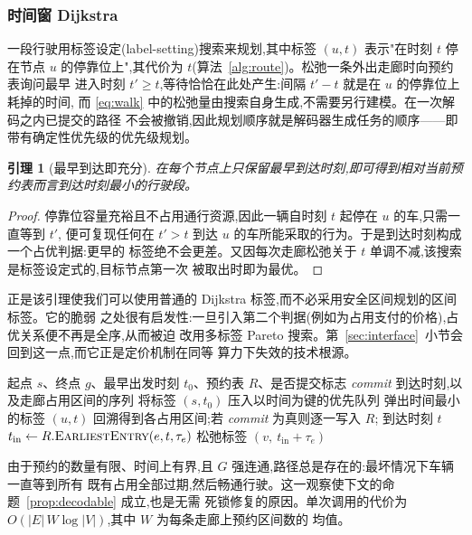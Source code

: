 \documentclass[manuscript,screen,review]{acmart}
\newtheorem{lem}{引理}
\begin{document}
\subsubsection{时间窗 Dijkstra}
一段行驶用标签设定(label-setting)搜索来规划,其中标签 $(u,t)$ 表示"在时刻 $t$ 停在节点
$u$ 的停靠位上",其代价为 $t$(算法~\ref{alg:route})。松弛一条外出走廊时向预约表询问最早
进入时刻 $t'\ge t$,等待恰恰在此处产生:间隔 $t'-t$ 就是在 $u$ 的停靠位上耗掉的时间,
而 \eqref{eq:walk} 中的松弛量由搜索自身生成,不需要另行建模。在一次解码之内已提交的路径
不会被撤销,因此规划顺序就是解码器生成任务的顺序——即带有确定性优先级的优先级规划。

\begin{lem}[最早到达即充分]
\label{lem:label}
在每个节点上只保留最早到达时刻,即可得到相对当前预约表而言到达时刻最小的行驶段。
\end{lem}

\begin{proof}
停靠位容量充裕且不占用通行资源,因此一辆自时刻 $t$ 起停在 $u$ 的车,只需一直等到 $t'$,
便可复现任何在 $t'>t$ 到达 $u$ 的车所能采取的行为。于是到达时刻构成一个占优判据:更早的
标签绝不会更差。又因每次走廊松弛关于 $t$ 单调不减,该搜索是标签设定式的,目标节点第一次
被取出时即为最优。
\end{proof}

正是该引理使我们可以使用普通的 Dijkstra 标签,而不必采用安全区间规划的区间标签。它的脆弱
之处很有启发性:一旦引入第二个判据(例如为占用支付的价格),占优关系便不再是全序,从而被迫
改用多标签 Pareto 搜索。第~\ref{sec:interface}~小节会回到这一点,而它正是定价机制在同等
算力下失效的技术根源。

\begin{algorithm}[t]
\caption{\textsc{Route}:无冲突的单段路径规划}
\label{alg:route}
\small
\begin{algorithmic}[1]
\Require 起点 $s$、终点 $g$、最早出发时刻 $t_0$、预约表 $R$、是否提交标志 \textit{commit}
\Ensure 到达时刻,以及走廊占用区间的序列
\State 将标签 $(s,t_0)$ 压入以时间为键的优先队列
  \State 弹出时间最小的标签 $(u,t)$
   \State 回溯得到各占用区间;若 \textit{commit} 为真则逐一写入 $R$;
       \Return 到达时刻 $t$ \EndIf
    \State $t_{\text{in}} \gets R.\textsc{EarliestEntry}(e,t,\tau_e)$
    \State 松弛标签 $(v,\ t_{\text{in}}+\tau_e)$
  \EndFor
\EndWhile
\end{algorithmic}
\end{algorithm}

由于预约的数量有限、时间上有界,且 $G$ 强连通,路径总是存在的:最坏情况下车辆一直等到所有
既有占用全部过期,然后畅通行驶。这一观察使下文的命题~\ref{prop:decodable} 成立,也是无需
死锁修复的原因。单次调用的代价为 $O(|E|\,W\log|V|)$,其中 $W$ 为每条走廊上预约区间数的
均值。
\end{document}

